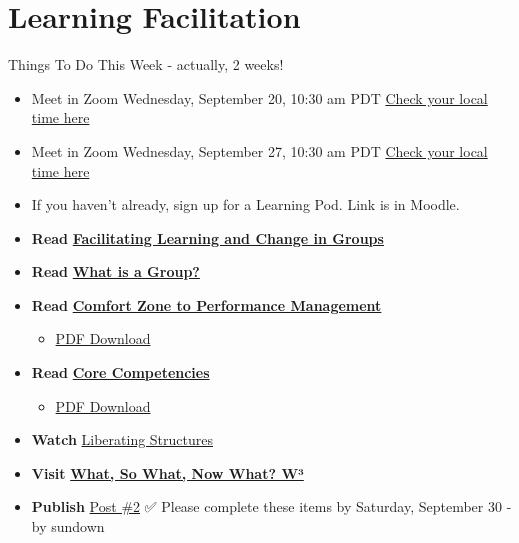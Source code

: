 \documentclass[
]{book}
\providecommand{\tightlist}{%
  \setlength{\itemsep}{0pt}\setlength{\parskip}{0pt}}
\begin{document}
\hypertarget{learning-facilitation}{%
\chapter{Learning Facilitation}\label{learning-facilitation}}

\begin{feedback}
{Things To Do This Week - actually, 2 weeks!}

\begin{itemize}
\tightlist
\item
  Meet in Zoom {Wednesday, September 20, 10:30 am PDT} \href{https://www.timeanddate.com/worldclock/fixedtime.html?msg=LDRS663+Meeting\&iso=20230920T1030\&p1=256\&ah=1}{Check your local time here}
\item
  Meet in Zoom {Wednesday, September 27, 10:30 am PDT} \href{https://www.timeanddate.com/worldclock/fixedtime.html?msg=LDRS663+Meeting\&iso=20230927T1030\&p1=256\&ah=1}{Check your local time here}
\item
  If you haven't already, sign up for a Learning Pod. Link is in Moodle.
\item
  \textbf{Read} \href{https://infed.org/mobi/facilitating-learning-and-change-in-groups-and-group-sessions/}{\textbf{Facilitating Learning and Change in Groups}}\\
\item
  \textbf{Read} \href{https://infed.org/mobi/what-is-a-group/}{\textbf{What is a Group?}}\\
\item
  \textbf{Read} \href{https://www.researchgate.net/publication/228957278_From_Comfort_Zone_to_Performance_Management}{\textbf{Comfort Zone to Performance Management}}

  \begin{itemize}
  \tightlist
  \item
    \href{assets/Performance_Management.pdf}{PDF Download}
  \end{itemize}
\item
  \textbf{Read} \href{https://www.iaf-world.org/site/professional/core-competencies}{\textbf{Core Competencies}}

  \begin{itemize}
  \tightlist
  \item
    \href{assets/core-comp.pdf}{PDF Download}
  \end{itemize}
\item
  \textbf{Watch} \href{https://player.vimeo.com/video/364868276}{Liberating Structures}\\
\item
  \textbf{Visit} \href{http://www.liberatingstructures.com/9-what-so-what-now-what-w/}{\textbf{What, So What, Now What? W³}}\\
\item
  \textbf{Publish} \href{https://ma-lead.github.io/ldrs663/assessments.html\#post-2}{Post \#2}
  ✅ Please complete these items by {Saturday, September 30 - by sundown}
\end{itemize}
\end{feedback}
\end{document}

